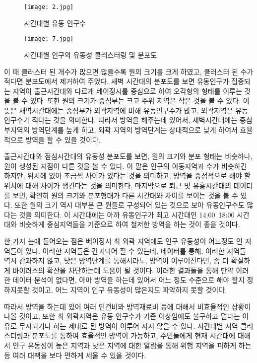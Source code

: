 \documentclass[10pt,journal,compsoc]{IEEEtran}
\begin{document}
\begin{figure*}[htp] 
    \centering
    \texttt{[image: 2.jpg]} 
    \caption{시간대별 유동 인구수} 
    \label{fig:5} 
\end{figure*}

\begin{figure*}[htp] 
    \centering
    \texttt{[image: 7.jpg]} 
    \caption{시간대별 인구의 유동성 클러스터링 및 분포도} 
    \label{fig:6} 
\end{figure*}

이 때 클러스터 된 개수가 많으면 많을수록 원의 크기를 크게 하였고, 클러스터 된 수가 적다면 분포도에서 제거하여 주었다. 새벽 시간대의 분포도를 보면 유동인구가 집중되는 지역이 출근시간대와 다르게 베이징시를 중심으로 하여 오각형의 형태를 이루는 것을 볼 수 있다. 또한 원의 크기가 중심부는 크고 주위 지역은 작은 것을 볼 수 있다. 이 뜻은 새벽시간대에는 중심부가 외곽지역에 비해 유동인구수가 많고, 외곽지역은 유동인구수가 적다는 것을 의미한다. 따라서 방역을 해주는데 있어서, 새벽시간대에는 중심부지역의 방역단계를 높게 하고, 외곽 지역의 방역단계는 상대적으로 낮게 하여서 효율적으로 방역을 할 수 있을 것이다.

출근시간대와 점심시간대의 유동성 분포도를 보면, 원의 크기와 분포 형태는 비슷하나, 원이 생성된 지점이 다른 것을 볼 수 있다. 이 말은 인구의 이동지역과 수가 비슷하긴 하지만, 위치에 있어 조금씩 차이가 있다는 것을 의미하고, 방역을 중점적으로 해야 할 위치에 대해 차이가 생긴다는 것을 의미한다. 마지막으로 퇴근 및 유흥시간대의 데이터를 보면, 확연히 원의 크기와 분포형태가 다른 시간대와 차이를 보이는 것을 볼 수 있다. 또한 원의 크기 역시 대부분 큰 원들로 구성되어 있는 것으로 보아 유동인구수도 많다는 것을 의미한다. 이 시간대에는 아까 유동인구가 최고 시간대인 14:00~18:00 시간대와 비슷하게 중심지역들을 기준으로 하여 철저한 방역을 하는 것이 좋을 것이다.

한 가지 눈에 들어오는 점은 베이징시 최 외곽 지역에도 인구 유동성이 어느정도 인 지역들이 있다. 이러한 지역들은 간과되어 질 수 있는데, 데이터를 통해, 이러한 지역들 역시 간과하지 않고, 낮은 방역단계를 통해서라도, 방역이 이루어진다면, 좀 더 확실하게 바이러스의 확산을 차단하는데 도움이 될 것이다. 이러한 결과들을 통해 만약 이러한 데이터 분석이 없다면, 아마 방역을 하는데 있어서 어느 정도 수준으로 해야 할지 정하지못할 것이고, 어느 지역이 인구 유동성이 많은지도 파악하지 못할 것이다.

따라서 방역을 하는데 있어 여러 인건비와 방역재료비 등에 대해서 비효율적인 상황이 나올 것이고, 또한 최 외곽지역은 유동 인구수가 기준 이상임에도 불구하고 멀다는 이유로 무시되거나 하는 제대로 된 방역이 이루어 지지 않을 수 있다. 시간대별 지역 클러스터링과 분포도를 통하여 효율적인 방역이 가능하고, 주민들에게 현재 시간대에 대해서 인구 유동성이 높은 지역과 낮은 지역에 대한 알람을 통해 위험 지역을 피하게 하는 등 여러 대책을 보다 편하게 세울 수 있을 것이다.
\end{document}
